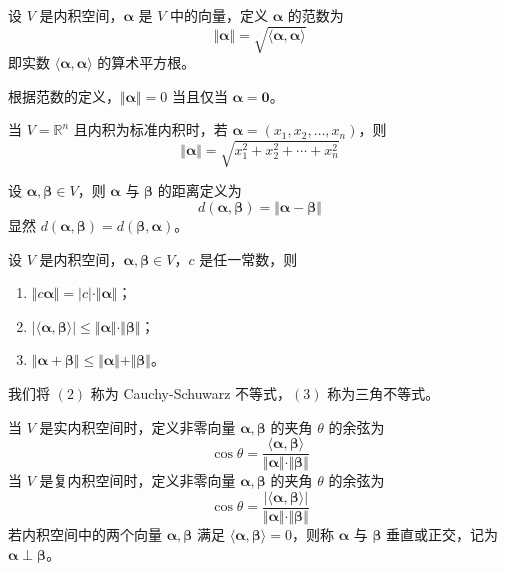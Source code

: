 \begin{definition}
    设 $V$ 是内积空间，$\bm{\alpha}$ 是 $V$ 中的向量，定义 $\bm{\alpha}$ 的范数为
    \[
        \Vert \bm{\alpha} \Vert = \sqrt{\langle \bm{\alpha}, \bm{\alpha} \rangle}
    \]
    即实数 $\langle \bm{\alpha}, \bm{\alpha} \rangle$ 的算术平方根。
\end{definition}

\begin{remark}
    根据范数的定义，$\Vert \bm{\alpha} \Vert = 0$ 当且仅当 $\bm{\alpha} = \bm{0}$。
\end{remark}

\begin{remark}
    当 $V = \mathbb{R}^n$ 且内积为标准内积时，若 $\bm{\alpha} = (x_1, x_2, \ldots, x_n)$，则
    \[
        \Vert \bm{\alpha} \Vert = \sqrt{x_{1}^{2} + x_{2}^{2} + \cdots + x_{n}^{2}}
    \]
\end{remark}

\begin{remark}
    设 $\bm{\alpha}, \bm{\beta} \in V$，则 $\bm{\alpha}$ 与 $\bm{\beta}$ 的距离定义为
    \[
        d(\bm{\alpha}, \bm{\beta}) = \Vert \bm{\alpha} - \bm{\beta} \Vert
    \]
    显然 $d(\bm{\alpha}, \bm{\beta}) = d(\bm{\beta}, \bm{\alpha})$。
\end{remark}

\begin{theorem}
    设 $V$ 是内积空间，$\bm{\alpha}, \bm{\beta} \in V$，$c$ 是任一常数，则
    \begin{enumerate}
        \item $\Vert c \bm{\alpha} \Vert = \vert c \vert \cdot \Vert \bm{\alpha} \Vert $；
        \item $\vert \langle \bm{\alpha}, \bm{\beta} \rangle \vert \leqslant \Vert \bm{\alpha} \Vert \cdot \Vert \bm{\beta} \Vert $；
        \item $\Vert \bm{\alpha} + \bm{\beta} \Vert \leqslant \Vert \bm{\alpha} \Vert + \Vert \bm{\beta} \Vert $。
    \end{enumerate}
\end{theorem}

\begin{remark}
    我们将 $(2)$ 称为 Cauchy-Schuwarz 不等式，$(3)$ 称为三角不等式。
\end{remark}

\begin{definition}
    当 $V$ 是实内积空间时，定义非零向量 $\bm{\alpha}, \bm{\beta}$ 的夹角 $\theta$ 的余弦为
    \[
        \cos \theta = \frac{\langle \bm{\alpha}, \bm{\beta} \rangle}{\Vert \bm{\alpha} \Vert \cdot \Vert \bm{\beta} \Vert}
    \]
    当 $V$ 是复内积空间时，定义非零向量 $\bm{\alpha}, \bm{\beta}$ 的夹角 $\theta$ 的余弦为
    \[
        \cos \theta = \frac{\vert \langle \bm{\alpha}, \bm{\beta} \rangle \vert}{\Vert \bm{\alpha} \Vert \cdot \Vert \bm{\beta} \Vert}
    \]
    若内积空间中的两个向量 $\bm{\alpha}, \bm{\beta}$ 满足 $\langle \bm{\alpha}, \bm{\beta} \rangle = 0$，则称 $\bm{\alpha}$ 与 $\bm{\beta}$ 垂直或正交，记为 $\bm{\alpha} \perp \bm{\beta}$。
\end{definition}

